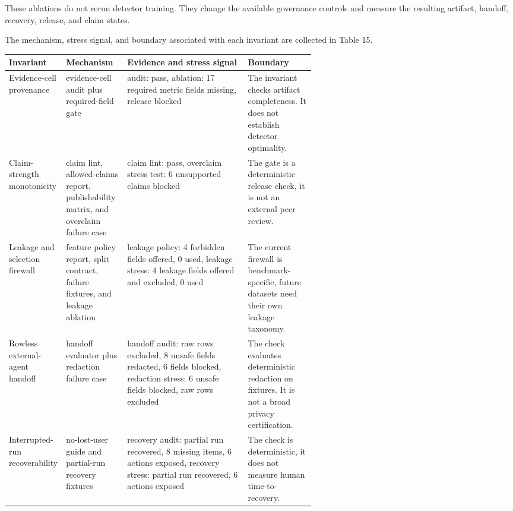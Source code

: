 \documentclass[11pt]{article}
\begin{document}
These ablations do not rerun detector training. They change the available governance controls and measure the resulting artifact, handoff, recovery, release, and claim states.

The mechanism, stress signal, and boundary associated with each invariant are collected in Table 15.

\begin{center}
\begin{minipage}{\linewidth}
\small
\setlength{\tabcolsep}{3pt}
\renewcommand{\arraystretch}{1.16}
\begin{tabularx}{\linewidth}{@{}>{\raggedright\arraybackslash}p{0.18\linewidth} >{\raggedright\arraybackslash}p{0.20\linewidth} >{\raggedright\arraybackslash}X >{\raggedright\arraybackslash}p{0.22\linewidth}@{}}
\toprule
Invariant & Mechanism & Evidence and stress signal & Boundary \\
\midrule
Evidence-cell provenance & evidence-cell audit plus required-field gate & audit: pass, ablation: 17 required metric fields missing, release blocked & The invariant checks artifact completeness. It does not establish detector optimality. \\
Claim-strength monotonicity & claim lint, allowed-claims report, publishability matrix, and overclaim failure case & claim lint: pass, overclaim stress test: 6 unsupported claims blocked & The gate is a deterministic release check, it is not an external peer review. \\
Leakage and selection firewall & feature policy report, split contract, failure fixtures, and leakage ablation & leakage policy: 4 forbidden fields offered, 0 used, leakage stress: 4 leakage fields offered and excluded, 0 used & The current firewall is benchmark-specific, future datasets need their own leakage taxonomy. \\
Rowless external-agent handoff & handoff evaluator plus redaction failure case & handoff audit: raw rows excluded, 8 unsafe fields redacted, 6 fields blocked, redaction stress: 6 unsafe fields blocked, raw rows excluded & The check evaluates deterministic redaction on fixtures. It is not a broad privacy certification. \\
Interrupted-run recoverability & no-lost-user guide and partial-run recovery fixtures & recovery audit: partial run recovered, 8 missing items, 6 actions exposed, recovery stress: partial run recovered, 6 actions exposed & The check is deterministic, it does not measure human time-to-recovery. \\

\end{tabularx}
\end{minipage}
\end{center}
\end{document}
